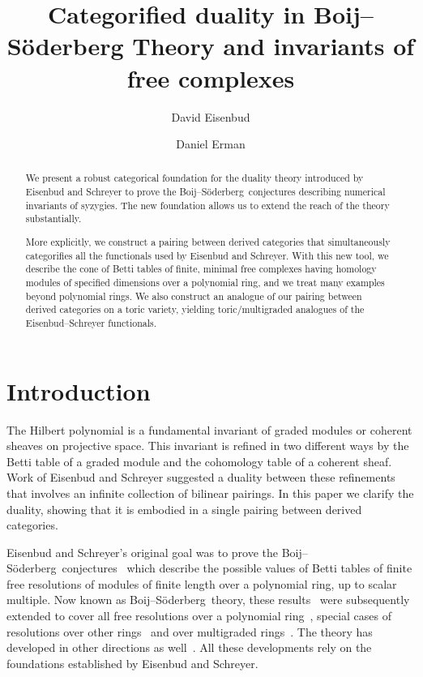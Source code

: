 \documentclass[12pt]{amsart}
\title{Categorified duality in Boij--S\"oderberg Theory and invariants of free complexes}
\author{David Eisenbud}
\author{Daniel Erman}
\theoremstyle{definition}
\theoremstyle{remark}
\def\BS{Boij--S\"oderberg~}
\begin{document}
\begin{abstract} 
We present a robust categorical foundation for the duality theory introduced by Eisenbud and Schreyer to prove the \BS conjectures describing numerical invariants of syzygies.
The new foundation allows us to extend the reach of the theory substantially.

More explicitly, we construct a pairing between derived categories that
simultaneously categorifies all the functionals used by Eisenbud and Schreyer.
With this new tool, we describe the cone of Betti tables of finite, minimal free complexes  having homology modules of specified dimensions over a polynomial ring, and we treat many examples beyond polynomial rings.  We also construct an analogue of our pairing between derived categories on a toric variety, yielding
toric/multigraded analogues of the Eisenbud--Schreyer functionals.

\end{abstract}

\maketitle

\vspace{-1cm}
\tableofcontents



\vspace{-1cm}
\section*{Introduction}
The Hilbert polynomial is a fundamental invariant of graded modules or coherent sheaves on projective space. This invariant is refined in two different ways by the Betti table of a graded module and the cohomology table of a coherent sheaf. Work of Eisenbud and Schreyer \cite{eis-schrey1} suggested a duality between these refinements that involves an infinite collection of bilinear pairings. In this paper we clarify the duality, showing that it is embodied in
a single pairing between derived categories.

Eisenbud and Schreyer's original goal was to prove the \BS conjectures~\cite{boij-sod1}
which describe the possible values of Betti tables of finite free resolutions of modules of finite length over a polynomial ring, up to scalar multiple.  
Now known as \BS theory, these results~\cite{efw,eis-schrey1} were subsequently extended to cover all free resolutions over a polynomial ring~\cite{boij-sod2,eis-schrey2},
special cases of resolutions over other rings~\cite{bbeg,beks-local} and over multigraded rings~\cite{boij-floystad,floystad-multigraded}. The theory has developed in other directions as well~\cite{beks-tensor, ees-filtering, erman-semigroup,nagel-sturgeon,sam-weyman}. All these developments rely on the foundations established by Eisenbud and Schreyer. 
\end{document}
